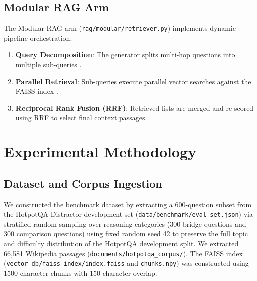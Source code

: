 \documentclass[conference]{IEEEtran}
\begin{document}
\subsection{Modular RAG Arm}
The Modular RAG arm (\texttt{rag/modular/retriever.py}) implements dynamic pipeline orchestration:
\begin{enumerate}
    \item \textbf{Query Decomposition}: The generator splits multi-hop questions into multiple sub-queries \cite{gao2023retrieval}.
    \item \textbf{Parallel Retrieval}: Sub-queries execute parallel vector searches against the FAISS index \cite{johnson2019billion}.
    \item \textbf{Reciprocal Rank Fusion (RRF)}: Retrieved lists are merged and re-scored using RRF \cite{cormack2009reciprocal} to select final context passages.
\end{enumerate}

\section{Experimental Methodology}
\label{sec:setup}

\subsection{Dataset and Corpus Ingestion}
We constructed the benchmark dataset by extracting a 600-question subset from the HotpotQA Distractor development set \cite{yang2018hotpotqa} (\texttt{data/benchmark/eval\_set.json}) via stratified random sampling over reasoning categories (300 bridge questions and 300 comparison questions) using fixed random seed 42 to preserve the full topic and difficulty distribution of the HotpotQA development split. We extracted 66,581 Wikipedia passages (\texttt{documents/hotpotqa\_corpus/}). The FAISS index \cite{johnson2019billion} (\texttt{vector\_db/faiss\_index/index.faiss} and \texttt{chunks.npy}) was constructed using 1500-character chunks with 150-character overlap.
\end{document}
